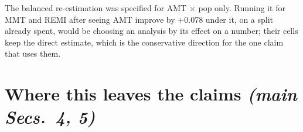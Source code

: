 \documentclass{article}
\begin{document}
The balanced re-estimation was specified for AMT $\times$ pop only. Running it for MMT
and REMI after seeing AMT improve by $+0.078$ under it, on a split already spent, would
be choosing an
analysis by its effect on a number; their cells keep the direct estimate, which is the
conservative direction for the one claim that uses them.

\section{Where this leaves the claims \normalfont\textit{(main Secs.~4, 5)}}

\end{document}
